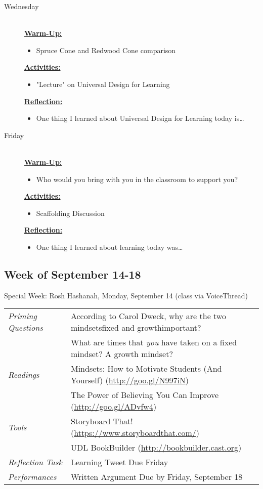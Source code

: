 \documentclass{tufte-handout}
\newcommand{\tabpq}{\faQuestionCircle\medspace\textit{Priming Questions}}
\newcommand{\tabread}{\faBook\medspace\textit{Readings}}
\newcommand{\tabperformance}{\faTasks\medspace\textit{Performances}}
\newcommand{\tabtools}{\faWrench\medspace\textit{Tools}}
\newcommand{\tabtweet}{\faLightbulbO\medspace\textit{Reflection Task} & Learning Tweet Due Friday \\}
\newenvironment{tabsched}
	{\small
	\begin{tabular}{p{1.5in}p{4.5in}}
	\toprule}
	{\bottomrule
	\end{tabular}
	\normalsize\\}
\newenvironment{specweek}
	{\begin{center}
		\fontseries{b} \faBullhorn \medspace Special Week: }
		{\medspace \faBullhorn \fontseries{m}
	\end{center}}
\newcommand{\weekfive}{September 14-18}
\newcommand{\roshhashanah}{Rosh Hashanah, Monday, September 14 (class via VoiceThread)}
\newcommand{\listwed}{\item[Wednesday] \hfill \\}
\newcommand{\listfri}{\item[Friday] \hfill \\}
\newenvironment{daywu}
	{\textbf{\underline{Warm-Up:}} \hfill \\
	\begin{itemize}}
	{\end{itemize}}
\newenvironment{dayact}
	{\textbf{\underline{Activities:}} \hfill \\
	\begin{itemize}}
	{\end{itemize}}
\newenvironment{dayref}
	{\textbf{\underline{Reflection:}} \hfill \\
	\begin{itemize}}
	{\end{itemize}}
\newenvironment{weeksched}
	{\noindent
	\begin{description}}
	{\end{description}
	\newpage}
\begin{document}
\begin{fullwidth}
\begin{weeksched}
\listwed
	\begin{daywu}
		\item Spruce Cone and Redwood Cone comparison
	\end{daywu}
	\begin{dayact}
		\item "Lecture" on Universal Design for Learning
	\end{dayact}
	\begin{dayref}
		\item One thing I learned about Universal Design for Learning today is\ldots
	\end{dayref}

\listfri
	\begin{daywu}
		\item Who would you bring with you in the classroom to support you?
	\end{daywu}
	\begin{dayact}
		\item Scaffolding Discussion
	\end{dayact}
	\begin{dayref}
		\item One thing I learned about learning today was\ldots
	\end{dayref}
\end{weeksched}

\subsection{Week of \weekfive}

\begin{specweek}\roshhashanah\end{specweek}

\begin{tabsched}
	\tabpq & According to Carol Dweck, why are the two mindsets\textemdash{}fixed and growth\textemdash{}important? \\
	& What are times that \emph{you} have taken on a fixed mindset? A growth mindset? \\
	\midrule
	\tabread & Mindsets: How to Motivate Students (And Yourself) (\url{http://goo.gl/N997iN}) \\
	& The Power of Believing You Can Improve (\url{http://goo.gl/ADvfw4}) \\
	\midrule
	\tabtools & Storyboard That! (\url{https://www.storyboardthat.com/}) \\
	& UDL BookBuilder (\url{http://bookbuilder.cast.org}) \\
	\midrule
	\tabtweet
	\midrule
	\tabperformance & Written Argument Due by Friday, September 18 \\
\end{tabsched}


\end{fullwidth}
\end{document}
